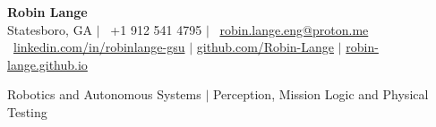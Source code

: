 \begin{center}
{\Huge\sffamily\bfseries\color{resumenavy} Robin Lange}\\[3pt]
{\small Statesboro, GA $|$ \contacticon{\faPhone}\ +1 912 541 4795 $|$ \contacticon{\faEnvelope}\ \href{mailto:robin.lange.eng@proton.me}{robin.lange.eng@proton.me}}\\[2pt]
{\small \contacticon{\faLinkedin}\ \href{https://www.linkedin.com/in/robinlange-gsu}{linkedin.com/in/robinlange-gsu} $|$ \href{https://github.com/Robin-Lange}{github.com/Robin-Lange} $|$ \href{https://robin-lange.github.io/}{robin-lange.github.io}}
\end{center}
\vspace{-5pt}
{\small Robotics and Autonomous Systems $|$ Perception, Mission Logic and Physical Testing}
